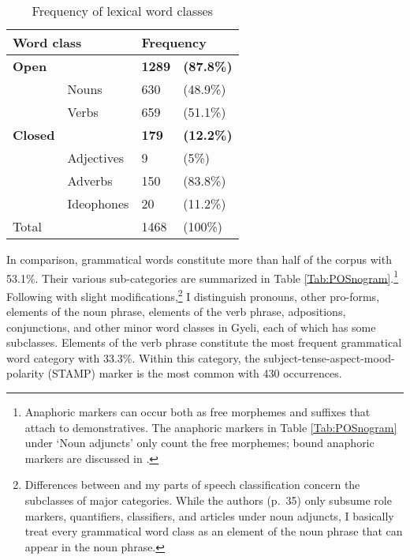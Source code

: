 \begin{table} 
\centering
\begin{tabular}{ll|ll}
 \midrule
  \multicolumn{2}{l}{Word class} &  \multicolumn{2}{l}{Frequency}  \\ %
 \midrule
  {\bfseries Open} &  & {\bfseries 1289}  & {\bfseries (87.8\%)} \\
  & Nouns  & 630  &  (48.9\%) \\
 &   Verbs  &  659  &  (51.1\%)  \\ %
 \midrule
  {\bfseries Closed} &  & {\bfseries 179} & {\bfseries (12.2\%)} \\
 & Adjectives &  9 &  (5\%)   \\
  & Adverbs   & 150 &   (83.8\%)   \\ %
 & Ideophones    &  20  &  (11.2\%) \\ 
 \midrule
Total & & 1468 & (100\%) \\
 \midrule
\end{tabular}
\caption{Frequency of lexical word classes}
\label{Tab:POSnolex}
\end{table}


In comparison, grammatical words constitute more than half of the corpus with 53.1\%. Their various sub-categories are summarized in Table \ref{Tab:POSnogram}.\footnote{Anaphoric markers can occur both as free morphemes and suffixes that attach to demonstratives. The anaphoric markers in Table \ref{Tab:POSnogram} under `Noun adjuncts' only count the free morphemes; bound anaphoric markers are discussed in .} Following \citet{schachter2007} with slight modifications,\footnote{Differences between \citet{schachter2007} and my parts of speech classification concern the subclasses of major categories. While the authors (p.\ 35) only subsume role markers, quantifiers, classifiers, and articles under noun adjuncts, I basically treat every grammatical word class as an element of the noun phrase that can appear in the noun phrase.} I distinguish pronouns, other pro-forms, elements of the noun phrase, elements of the verb phrase, adpositions, conjunctions, and other minor word classes in Gyeli, each of which has some subclasses. Elements of the verb phrase constitute the most frequent grammatical word category with 33.3\%. Within this category, the subject-tense-aspect-mood-polarity (STAMP) marker is the most common with 430 occurrences.

